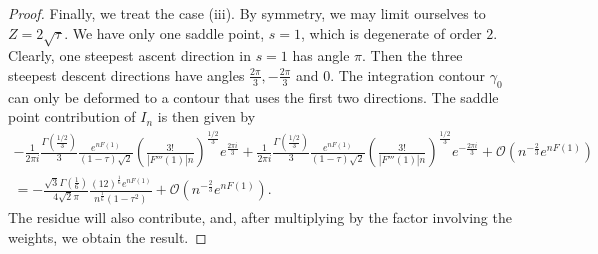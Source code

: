 \documentclass[%
 jmp,
cp,  %
 amsmath,amsthm,amssymb,%
 reprint,%
onecolumn]{revtex4-2}
\newtheorem{theorem}{Theorem}[section]
\begin{document}
\begin{proof}
Finally, we treat the case (iii). By symmetry, we may limit ourselves to $Z=2\sqrt \tau$. We have only one saddle point, $s= 1$, which is degenerate of order $2$. Clearly, one steepest ascent direction in $s=1$ has angle $\pi$. Then the three steepest descent directions have angles $\frac{2\pi}{3}, -\frac{2\pi}{3}$ and $0$. The integration contour $\gamma_0$ can only be deformed to a contour that uses the first two directions.  The saddle point contribution of $I_n$ is then given by 
\begin{multline*}
-\frac{1}{2\pi i} \frac{\Gamma\left(\frac{1/2}{3}\right)}{3} \frac{e^{n F(1)}}{(1-\tau) \sqrt 2} \left(\frac{3!}{|F'''(1)|n}\right)^{\frac{1/2}{3}} e^{\frac{2\pi i}{3}} 
+\frac{1}{2\pi i} \frac{\Gamma\left(\frac{1/2}{3}\right)}{3} \frac{e^{n F(1)}}{(1-\tau) \sqrt 2} \left(\frac{3!}{|F'''(1)|n}\right)^{\frac{1/2}{3}} e^{-\frac{2\pi i}{3}} 
+ \mathcal O\left(n^{-\frac{2}{3}} e^{n F(1)}\right)\\
= -\frac{\sqrt{3}\Gamma\left(\frac{1}{6}\right)}{4\sqrt 2 \pi} \frac{(12)^\frac{1}{6} e^{n F(1)}}{n^\frac{1}{6}(1-\tau^2)}
+ \mathcal O\left(n^{-\frac{2}{3}} e^{n F(1)}\right). 
\end{multline*}
The residue will also contribute, and, after multiplying by the factor involving the weights, we obtain the result. 
\end{proof}


%



\end{document}

